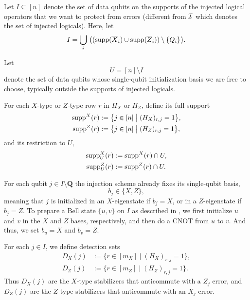Let $I \subseteq [n]$
denote the set of data qubits on the supports of the injected logical operators that we want to protect from errors (different from $ \mathcal{I} $ which denotes the set of injected logicals).
Here, let 
\begin{equation}
I = \bigcup_i \, \big((\mathrm{supp}(\overline{X}_i) \cup \mathrm{supp}(\overline{Z}_i)) \setminus \{Q_i\}\big).
\end{equation}

Let 
\begin{equation}
U = [n] \setminus I
\end{equation}
denote the set of data qubits whose single-qubit initialization basis we are free to choose, typically outside the supports of injected logicals.

For each $X$-type or $ Z $-type row $r$ in $H_X$ or $H_Z$, define its full support
\begin{equation}
  \begin{aligned}
  \mathrm{supp}^X(r) &:= \bigl\{ j \in [n] \;\big|\; (H_X)_{r,j} = 1 \bigr\}, \\
  \mathrm{supp}^Z(r) &:= \bigl\{ j \in [n] \;\big|\; (H_Z)_{r,j} = 1 \bigr\},
  \end{aligned}
\end{equation}
and its restriction to $U$,
\begin{equation}
  \begin{aligned}
  \mathrm{supp}^X_U(r) &:= \mathrm{supp}^X(r) \cap U, \\
  \mathrm{supp}^Z_U(r) &:= \mathrm{supp}^Z(r) \cap U.
  \end{aligned}
\end{equation}

For each qubit $j \in I \setminus {\bm Q}$ the injection scheme already fixes its single-qubit basis,
\begin{equation}
  b_j \in \{X,Z\},
\end{equation}
meaning that $j$ is initialized in an $X$-eigenstate if $b_j = X$, or in a $Z$-eigenstate if $b_j = Z$.
To prepare a Bell state $ \{u,v\} $ on $ I $ as described in ,
we first initialize $ u $ and $ v $ in the $ X $ and $ Z $ bases, respectively,
and then do a CNOT from $ u $ to $ v $.
And thus, we set $ b_u = X $ and $ b_v = Z $.

For each $j \in I$, we define detection sets
\begin{align}
  D_X(j) &:= \bigl\{ r \in [m_X] \;\big|\; (H_X)_{r,j} = 1 \bigr\},
  \label{eq:DX}
  \\
  D_Z(j) &:= \bigl\{ r \in [m_Z] \;\big|\; (H_Z)_{r,j} = 1 \bigr\}.
  \label{eq:DZ}
\end{align}
Thus $D_X(j)$ are the $X$-type stabilizers that anticommute with a $Z_j$ error, and $D_Z(j)$ are the $Z$-type stabilizers that anticommute with an $X_j$ error.

